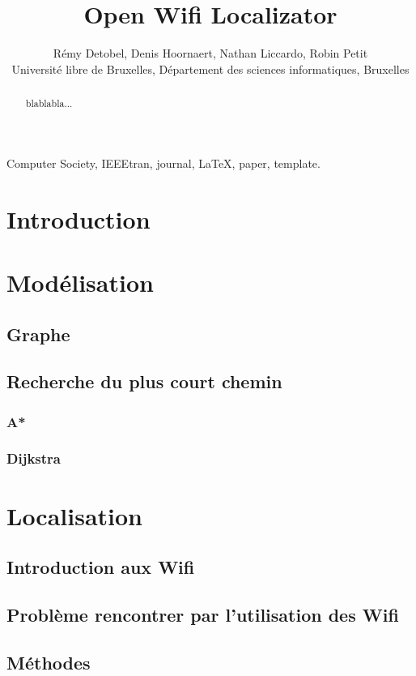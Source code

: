 \documentclass[11pt,journal,compsoc]{IEEEtran}
\begin{document}
\title{Open Wifi Localizator}
\author{Rémy Detobel, Denis Hoornaert, Nathan Liccardo, Robin Petit\\ Université libre de Bruxelles, Département des sciences informatiques, Bruxelles}

\maketitle


\begin{abstract}
  blablabla...
\end{abstract}
\begin{IEEEkeywords}
  Computer Society, IEEEtran, journal, \LaTeX, paper, template.
\end{IEEEkeywords}
\section{Introduction}
\section{Modélisation}
  \subsection{Graphe}
  \subsection{Recherche du plus court chemin}
    \subsubsection{A*}
    \subsubsection{Dijkstra}
\section{Localisation}
  \subsection{Introduction aux Wifi}
  \subsection{Problème rencontrer par l'utilisation des Wifi}
  \subsection{Méthodes}
\end{document}
